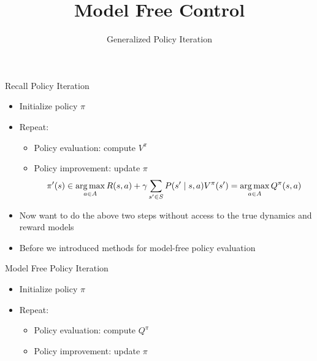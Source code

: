 \documentclass[aspectratio=169]{../latex_main/tntbeamer}  %
\title[RL: Model Free Control]{Model Free Control}
\subtitle{Generalized Policy Iteration}
\begin{document}
	
	\maketitle

\begin{frame}[c]{Recall Policy Iteration}

\begin{itemize}
	\item Initialize policy $\pi$
	\item Repeat:
	\begin{itemize}
		\item Policy evaluation: compute $V^\pi$
		\item Policy improvement: update $\pi$
	$$\pi'(s) \in \operatorname*{arg\,max}_{a \in A} R(s,a) + \gamma \sum_{s' \in S} P(s' \mid s,a) V^\pi (s') = \operatorname*{arg\,max}_{a \in A} Q^\pi (s,a) $$
	\end{itemize}
	\item Now want to do the above two steps \alert{without} access to the true dynamics and reward models
	\item Before we introduced methods for model-free policy evaluation
\end{itemize}

\end{frame}
\begin{frame}[c]{Model Free Policy Iteration}
	
	\begin{itemize}
		\item Initialize policy $\pi$
		\item Repeat:
		\begin{itemize}
			\item Policy evaluation: compute $Q^\pi$
			\item Policy improvement: update $\pi$
		\end{itemize}
	\end{itemize}
	
\end{frame}
\end{document}
